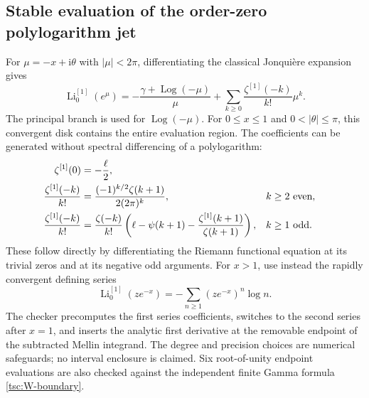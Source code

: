 \documentclass[11pt]{article}
\numberwithin{equation}{section}
\theoremstyle{definition}\newtheorem{definition}[theorem]{Definition}
\theoremstyle{remark}\newtheorem{remark}[theorem]{Remark}
\DeclareMathOperator{\Li}{Li}
\DeclareMathOperator{\Log}{Log}
\newcommand{\ii}{\mathrm i}
\begin{document}
\subsection{Stable evaluation of the order-zero polylogarithm jet}
For $\mu=-x+\ii\theta$ with $|\mu|<2\pi$, differentiating the classical
Jonqui\`ere expansion \cite[Eq.~25.12.12]{tsc:dlmf-poly} gives
\begin{equation}\label{tsc:Li-order-zero}
 \Li_0^{[1]}(e^\mu)
   =-\frac{\gamma+\Log(-\mu)}{\mu}
       +\sum_{k\ge0}\frac{\zeta^{[1]}(-k)}{k!}\mu^k.
\end{equation}
The principal branch is used for $\Log(-\mu)$.
For $0\le x\le1$ and $0<|\theta|\le\pi$, this convergent disk contains
the entire evaluation region. The coefficients can be generated without
spectral differencing of a polylogarithm:
\begin{align}\label{tsc:negative-zeta-derivative}
 \zeta^{[1]}(0)&=-\frac\ell2,\notag\\
 \frac{\zeta^{[1]}(-k)}{k!}
  &=\frac{(-1)^{k/2}\zeta(k+1)}{2(2\pi)^k},
                                      &&k\ge2\text{ even},\notag\\
 \frac{\zeta^{[1]}(-k)}{k!}
  &=\frac{\zeta(-k)}{k!}
       \left(\ell-\psi(k+1)
                     -\frac{\zeta^{[1]}(k+1)}{\zeta(k+1)}\right),
                                      &&k\ge1\text{ odd}.
\end{align}
These follow directly by differentiating the Riemann functional equation
at its trivial zeros and at its negative odd arguments.
For $x>1$, use instead the rapidly convergent defining series
\begin{equation}\label{tsc:Li-log-series}
 \Li_0^{[1]}(ze^{-x})=-\sum_{n\ge1}(ze^{-x})^n\log n.
\end{equation}
The checker precomputes the first series coefficients, switches to the
second series after $x=1$, and inserts the analytic first derivative at
the removable endpoint of the subtracted Mellin integrand. The degree and
precision choices are numerical safeguards; no interval enclosure is
claimed. Six root-of-unity endpoint evaluations are also checked against
the independent finite Gamma formula \eqref{tsc:W-boundary}.
\end{document}
